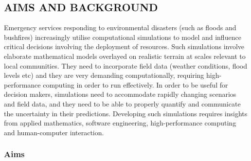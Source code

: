 \subsection*{AIMS AND BACKGROUND}

Emergency services responding to environmental disasters (such as
floods and bushfires) increasingly utilise computational simulations
to model and influence critical decisions involving the deployment of
resources. Such simulations involve elaborate mathematical models
overlayed on realistic terrain at scales relevant to local
communities. They need to incorporate field data (weather conditions,
flood levels etc) and they are very demanding computationally,
requiring high-performance computing in order to run effectively. In
order to be useful for decision makers, simulations need to
accommodate rapidly changing scenarios and field data, and they need
to be able to properly quantify and communicate the uncertainty in
their predictions. Developing such simulations requires insights from
applied mathematics, software engineering, high-performance computing
and human-computer interaction.

\iffalse
When systems are disrupted during environmental disasters (for example,
during floods, storm surges or tsunamis) information from
computational simulation is needed urgently to aid decision-making by
emergency services. This is not simply a matter of compute power but
requires insight from applied mathematics, software
engineering, human computer interaction, high performance computing
and data visualisation. All of these facets need to be tightly coupled
and {\bf tested in realistic  decision-making
scenarios} where decision makers collaborate with modelling experts. In
particular, a crucial aspect of advice provided from modellers to
decision makers is to {\bf properly quantify and communicate the
{uncertainty}} in predictions obtained by computer simulations.
This advice needs to be provided in a timely manner and in a context
where the computer support may vary dramatically due to
system outages.
\fi

\subsubsection*{Aims}


